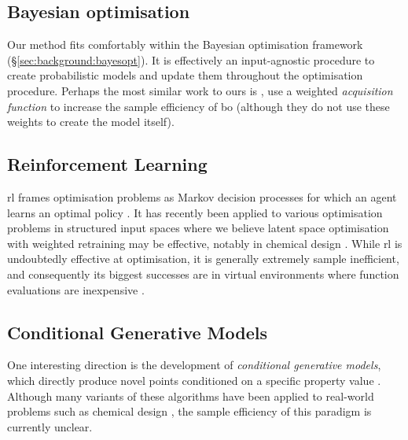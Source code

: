 \subsection{Bayesian optimisation}

Our method fits comfortably within the Bayesian optimisation framework (\S\ref{sec:background:bayesopt}).
It is effectively an input-agnostic procedure to create probabilistic models
and update them throughout the optimisation procedure.
Perhaps the most similar work to ours is \citet{blanchard_output_weighted_2020},
use a weighted \emph{acquisition function} to increase the sample efficiency of \gls{bo}
(although they do not use these weights to create the model itself).

\subsection{Reinforcement Learning}
\Gls{rl} frames optimisation problems as Markov decision processes for which an agent learns an optimal policy \citep{sutton1998introduction}.
It has recently been applied to various optimisation problems in structured input spaces \citep{li_deep_2018}
where we believe latent space optimisation with weighted retraining may be effective,
notably in chemical design \citep{you_graph_2018,zhou_optimization_2019,guimaraes_objective-reinforced_2018,olivecrona_molecular_2017,popova_deep_2018,simm_reinforcement_2020}.
While \gls{rl} is undoubtedly effective at optimisation, it is generally extremely sample inefficient,
and consequently its biggest successes are in virtual environments where function evaluations are inexpensive \citep{li_deep_2018}.

\subsection{Conditional Generative Models}
One interesting direction is the development of \emph{conditional generative models},
which directly produce novel points conditioned on a specific property value \citep{sohn_learning_2015,mirza_conditional_2014}.
Although many variants of these algorithms have been applied to real-world problems such as chemical design 
\citep{jin_learning_2019,kang_conditional_2019,li_multi-objective_2018,lim_molecular_2018,Brookes_Listgarten_2020},
the sample efficiency of this paradigm is currently unclear.
